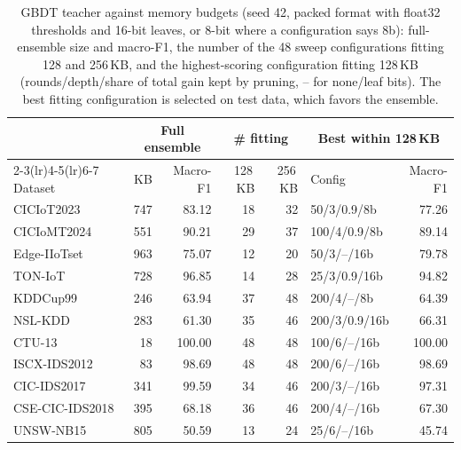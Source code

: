 \begin{table}[!t]
\centering
\caption{GBDT teacher against memory budgets (seed 42, packed format with float32 thresholds and 16-bit leaves, or 8-bit where a configuration says 8b): full-ensemble size and macro-F1, the number of the 48 sweep configurations fitting 128 and 256\,KB, and the highest-scoring configuration fitting 128\,KB (rounds/depth/share of total gain kept by pruning, -- for none/leaf bits). The best fitting configuration is selected on test data, which favors the ensemble.}
\label{tab:envelope}
\footnotesize
\setlength{\tabcolsep}{4pt}
\begin{tabular}{lrrrrlr}
\toprule
& \multicolumn{2}{c}{Full ensemble} & \multicolumn{2}{c}{\# fitting} & \multicolumn{2}{c}{Best within 128\,KB} \\
\cmidrule(lr){2-3}\cmidrule(lr){4-5}\cmidrule(lr){6-7}
Dataset & KB & Macro-F1 & 128\,KB & 256\,KB & Config & Macro-F1 \\
\midrule
CICIoT2023 & 747 & 83.12 & 18 & 32 & 50/3/0.9/8b & 77.26 \\
CICIoMT2024 & 551 & 90.21 & 29 & 37 & 100/4/0.9/8b & 89.14 \\
Edge-IIoTset & 963 & 75.07 & 12 & 20 & 50/3/--/16b & 79.78 \\
TON-IoT & 728 & 96.85 & 14 & 28 & 25/3/0.9/16b & 94.82 \\
\midrule
KDDCup99 & 246 & 63.94 & 37 & 48 & 200/4/--/8b & 64.39 \\
NSL-KDD & 283 & 61.30 & 35 & 46 & 200/3/0.9/16b & 66.31 \\
CTU-13 & 18 & 100.00 & 48 & 48 & 100/6/--/16b & 100.00 \\
ISCX-IDS2012 & 83 & 98.69 & 48 & 48 & 200/6/--/16b & 98.69 \\
CIC-IDS2017 & 341 & 99.59 & 34 & 46 & 200/3/--/16b & 97.31 \\
CSE-CIC-IDS2018 & 395 & 68.18 & 36 & 46 & 200/4/--/16b & 67.30 \\
UNSW-NB15 & 805 & 50.59 & 13 & 24 & 25/6/--/16b & 45.74 \\
\bottomrule
\end{tabular}
\end{table}
